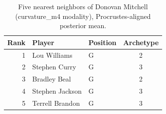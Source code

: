 \begin{table}[htbp]
  \centering\small
  \begin{tabular}{rllc}
    \toprule
    Rank & Player & Position & Archetype \\
    \midrule
    1 & Lou Williams & G & 2 \\
    2 & Stephen Curry & G & 3 \\
    3 & Bradley Beal & G & 2 \\
    4 & Stephen Jackson & G & 3 \\
    5 & Terrell Brandon & G & 3 \\
    \bottomrule
  \end{tabular}
  \caption{Five nearest neighbors of Donovan Mitchell (curvature_m4 modality), Procrustes-aligned posterior mean.}
  \label{tab:Donovan_Mitchell_neighbors_curvature_m4}
\end{table}

